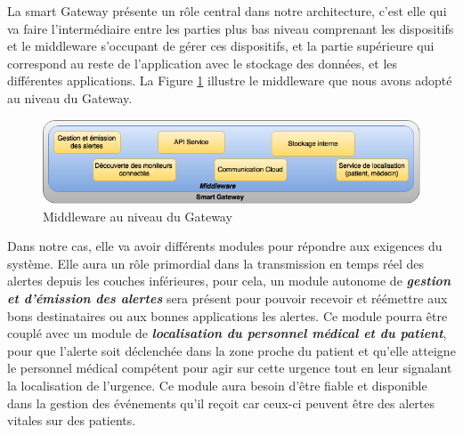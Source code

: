La smart Gateway présente un rôle central dans notre architecture, c’est elle qui va faire l’intermédiaire entre les parties plus bas niveau comprenant les dispositifs et le middleware s’occupant de gérer ces dispositifs, et la partie supérieure qui correspond au reste de l’application avec le stockage des données, et les différentes applications. La Figure \ref{gateway} illustre le middleware que nous avons adopté au niveau du Gateway.
\newline
\begin{figure}[h!]
	\hspace*{-3cm}
	\centering
	\includegraphics[width=1.5\textwidth]{Figure6.png}
	\caption{Middleware au niveau du Gateway}
	\label{gateway}
\end{figure}

Dans notre cas, elle va avoir différents modules pour répondre aux exigences du système. Elle aura un rôle primordial dans la transmission en temps réel des alertes depuis les couches inférieures, pour cela, un module autonome de \textbf{\textit{gestion et d’émission des alertes}} sera présent pour pouvoir recevoir et réémettre aux bons destinataires ou aux bonnes applications les alertes. Ce module pourra être couplé avec un module de \textbf{\textit{localisation du personnel médical et du patient}}, pour que l’alerte soit déclenchée dans la zone proche du patient et qu’elle atteigne le personnel médical compétent pour agir sur cette urgence tout en leur signalant la localisation de l’urgence. Ce module aura besoin d’être fiable et disponible dans la gestion des événements qu’il reçoit car ceux-ci peuvent être des alertes vitales sur des patients.

